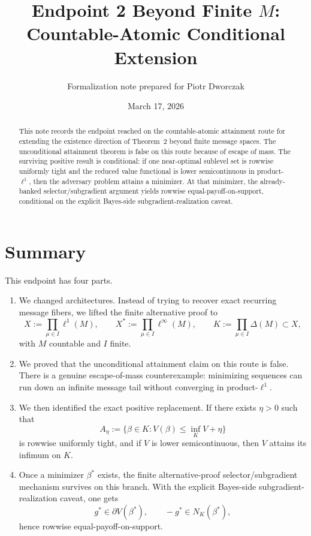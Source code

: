 \documentclass[12pt]{article}
\title{Endpoint 2 Beyond Finite $M$:\\
Countable-Atomic Conditional Extension}
\author{Formalization note prepared for Piotr Dworczak}
\date{March 17, 2026}
\begin{document}
\maketitle

\begin{abstract}
This note records the endpoint reached on the countable-atomic attainment route for extending the existence direction of Theorem~2 beyond finite message spaces.
The unconditional attainment theorem is false on this route because of escape of mass.
The surviving positive result is conditional:
if one near-optimal sublevel set is rowwise uniformly tight and the reduced value functional is lower semicontinuous in product-$\ell^1$, then the adversary problem attains a minimizer.
At that minimizer, the already-banked selector/subgradient argument yields rowwise equal-payoff-on-support, conditional on the explicit Bayes-side subgradient-realization caveat.
\end{abstract}

\tableofcontents

\section{Summary}

This endpoint has four parts.

\begin{enumerate}
\item We changed architectures. Instead of trying to recover exact recurring message fibers, we lifted the finite alternative proof to
\[
X := \prod_{\mu \in I} \ell^1(M),
\qquad
X^* := \prod_{\mu \in I} \ell^\infty(M),
\qquad
K := \prod_{\mu \in I} \Delta(M) \subset X,
\]
with $M$ countable and $I$ finite.

\item We proved that the unconditional attainment claim on this route is false.
There is a genuine escape-of-mass counterexample: minimizing sequences can run down an infinite message tail without converging in product-$\ell^1$.

\item We then identified the exact positive replacement.
If there exists $\eta > 0$ such that
\[
A_\eta := \{ \beta \in K : V(\beta) \le \inf_K V + \eta \}
\]
is rowwise uniformly tight, and if $V$ is lower semicontinuous, then $V$ attains its infimum on $K$.

\item Once a minimizer $\beta^*$ exists, the finite alternative-proof selector/subgradient mechanism survives on this branch.
With the explicit Bayes-side subgradient-realization caveat, one gets
\[
g^* \in \partial V(\beta^*),
\qquad
-g^* \in N_K(\beta^*),
\]
hence rowwise equal-payoff-on-support.
\end{enumerate}
\end{document}
